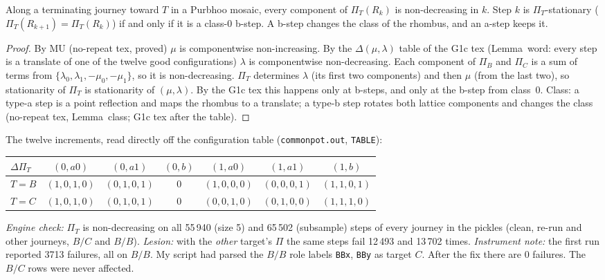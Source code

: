 \documentclass[11pt]{article}
\theoremstyle{definition}\newtheorem{definition}[theorem]{Definition}\newtheorem{remark}[theorem]{Remark}
\begin{document}
\begin{lemma}\label{lem:mono}
Along a terminating journey toward $T$ in a Purbhoo mosaic, every component of $\Pi_T(R_k)$ is non-decreasing in $k$. Step $k$ is $\Pi_T$-stationary ($\Pi_T(R_{k+1})=\Pi_T(R_k)$) if and only if it is a class-$0$ b-step. A b-step changes the class of the rhombus, and an a-step keeps it.
\end{lemma}
\begin{proof}
By MU (no-repeat tex, proved) $\mu$ is componentwise non-increasing. By the $\Delta(\mu,\lambda)$ table of the G1c tex (Lemma~word: every step is a translate of one of the twelve good configurations) $\lambda$ is componentwise non-decreasing. Each component of $\Pi_B$ and $\Pi_C$ is a sum of terms from $\{\lambda_0,\lambda_1,-\mu_0,-\mu_1\}$, so it is non-decreasing. $\Pi_T$ determines $\lambda$ (its first two components) and then $\mu$ (from the last two), so stationarity of $\Pi_T$ is stationarity of $(\mu,\lambda)$. By the G1c tex this happens only at b-steps, and only at the b-step from class~0. Class: a type-a step is a point reflection and maps the rhombus to a translate; a type-b step rotates both lattice components and changes the class (no-repeat tex, Lemma~class; G1c tex after the table).
\end{proof}
\noindent The twelve increments, read directly off the configuration table (\texttt{commonpot.out}, \texttt{TABLE}):
\begin{center}\small\begin{tabular}{lcccccc}\toprule
$\Delta\Pi_T$ & $(0,a0)$ & $(0,a1)$ & $(0,b)$ & $(1,a0)$ & $(1,a1)$ & $(1,b)$\\\midrule
$T=B$ & $(1,0,1,0)$ & $(0,1,0,1)$ & $0$ & $(1,0,0,0)$ & $(0,0,0,1)$ & $(1,1,0,1)$\\
$T=C$ & $(1,0,1,0)$ & $(0,1,0,1)$ & $0$ & $(0,0,1,0)$ & $(0,1,0,0)$ & $(1,1,1,0)$\\\bottomrule
\end{tabular}\end{center}
\emph{Engine check:} $\Pi_T$ is non-decreasing on all 55\,940 (size 5) and 65\,502 (subsample) steps of every journey in the pickles (clean, re-run and other journeys, $B/C$ and $B/B$). \emph{Lesion:} with the \emph{other} target's $\Pi$ the same steps fail 12\,493 and 13\,702 times. \emph{Instrument note:} the first run reported 3713 failures, all on $B/B$. My script had parsed the $B/B$ role labels \texttt{BBx}, \texttt{BBy} as target $C$. After the fix there are 0 failures. The $B/C$ rows were never affected.
\end{document}
